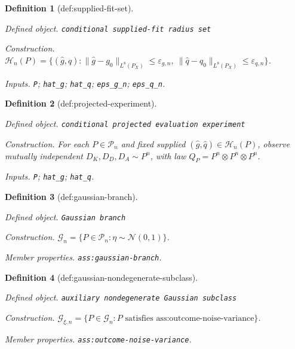 \documentclass{article}
\newtheorem{definition}{Definition}
\begin{document}
\begin{definition}[def:supplied-fit-set]\label{def:supplied-fit-set}
\par\smallskip\noindent\emph{Defined object.} \texttt{conditional supplied-\allowbreak{}fit radius set}
\par\smallskip\noindent\emph{Construction.} \(\mathcal H_n(P)=\{(\widehat g,\widehat q):\|\widehat g-g_0\|_{L^8(P_X)}\le\varepsilon_{g,n},\ \|\widehat q-q_0\|_{L^8(P_X)}\le\varepsilon_{q,n}\}\).
\par\smallskip\noindent\emph{Inputs.} \texttt{P}; \texttt{hat\_\allowbreak{}g}; \texttt{hat\_\allowbreak{}q}; \texttt{eps\_\allowbreak{}g\_\allowbreak{}n}; \texttt{eps\_\allowbreak{}q\_\allowbreak{}n}.
\end{definition}

\begin{definition}[def:projected-experiment]\label{def:projected-experiment}
\par\smallskip\noindent\emph{Defined object.} \texttt{conditional projected evaluation experiment}
\par\smallskip\noindent\emph{Construction.} For each \(P\in\mathcal P_n\) and fixed supplied \((\widehat g,\widehat q)\in\mathcal H_n(P)\), observe mutually independent \(D_K,D_D,D_A\sim P^n\), with law \(Q_P=P^n\otimes P^n\otimes P^n\).
\par\smallskip\noindent\emph{Inputs.} \texttt{P}; \texttt{hat\_\allowbreak{}g}; \texttt{hat\_\allowbreak{}q}.
\end{definition}

\begin{definition}[def:gaussian-branch]\label{def:gaussian-branch}
\par\smallskip\noindent\emph{Defined object.} \texttt{Gaussian branch}
\par\smallskip\noindent\emph{Construction.} \(\mathcal G_n=\{P\in\mathcal P_n:\eta\sim\mathcal N(0,1)\}\).
\par\smallskip\noindent\emph{Member properties.} \texttt{ass:\allowbreak{}gaussian-\allowbreak{}branch}.
\end{definition}

\begin{definition}[def:gaussian-nondegenerate-subclass]\label{def:gaussian-nondegenerate-subclass}
\par\smallskip\noindent\emph{Defined object.} \texttt{auxiliary nondegenerate Gaussian subclass}
\par\smallskip\noindent\emph{Construction.} \(\mathcal G_{\xi,n}=\{P\in\mathcal G_n:P\text{ satisfies }\text{ass:outcome-noise-variance}\}\).
\par\smallskip\noindent\emph{Member properties.} \texttt{ass:\allowbreak{}outcome-\allowbreak{}noise-\allowbreak{}variance}.
\end{definition}
\end{document}
